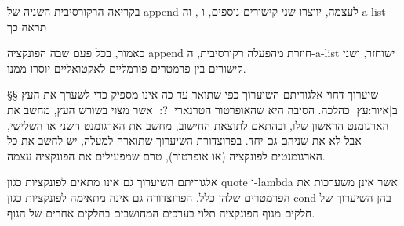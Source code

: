 בקריאה הרקורסיבית השניה של append לעצמה, יווצרו שני קישורים נוספים,
 ו-, וה-a-list תראה כך
\begin{LTR}
  \usetikzlibrary{chains,arrows}
\end{LTR}
כאמור, בכל פעם שבה הפונקציה append חוזרת מהפעלה רקורסיבית, ה-a-list ישוחזר,
ושני קישורים בין פרמטרים פורמליים לאקטואליים יוסרו ממנו.

§§ שיערוך דחוי
אלגוריתם השיערוך כפי שתואר עד כה אינו מספיק כדי לשערך את העץ ב|איור:עץ|
כהלכה. הסיבה היא שהאופרטור הטרנארי \T|?:| אשר מצוי בשורש העץ, מחשב את הארגומנט
הראשון שלו, ובהתאם לתוצאת החישוב, מחשב את הארגומנט השני או השלישי, אבל לא את
שניהם גם יחד. בפרוצדורת השיערוך שתוארה למעלה, יש לחשב את כל הארגומנטים לפונקציה
(או אופרטור), טרם שמפעילים את הפונקציה עצמה.

אלגוריתם השיערוך גם אינו מתאים לפונקציות כגון quote ו-lambda אשר אינן משערכות
את הפרמטרים שלהן כלל. הפרוצדורה גם אינה מתאימה לפונקציות כגון cond בהן השיערוך
של חלקים מגוף הפונקציה תלוי בערכים המחושבים בחלקים אחרים של הגוף.

